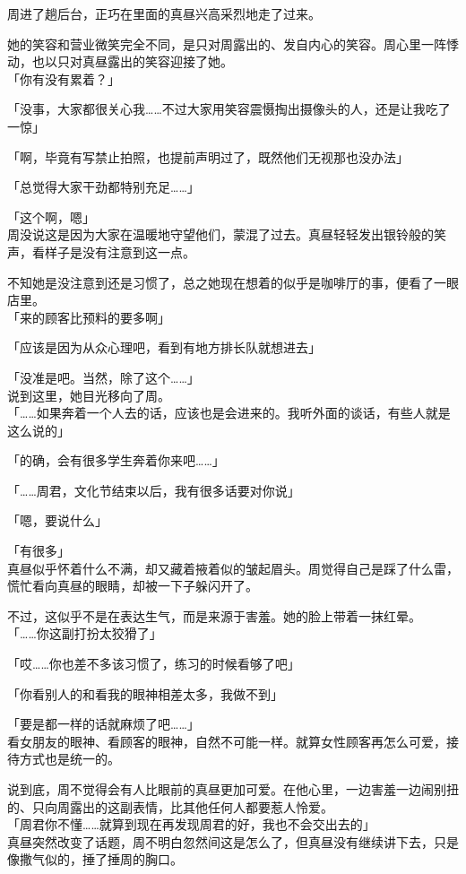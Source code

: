 周进了趟后台，正巧在里面的真昼兴高采烈地走了过来。

她的笑容和营业微笑完全不同，是只对周露出的、发自内心的笑容。周心里一阵悸动，也以只对真昼露出的笑容迎接了她。\\

「你有没有累着？」

「没事，大家都很关心我……不过大家用笑容震慑掏出摄像头的人，还是让我吃了一惊」

「啊，毕竟有写禁止拍照，也提前声明过了，既然他们无视那也没办法」

「总觉得大家干劲都特别充足……」

「这个啊，嗯」\\

周没说这是因为大家在温暖地守望他们，蒙混了过去。真昼轻轻发出银铃般的笑声，看样子是没有注意到这一点。

不知她是没注意到还是习惯了，总之她现在想着的似乎是咖啡厅的事，便看了一眼店里。\\

「来的顾客比预料的要多啊」

「应该是因为从众心理吧，看到有地方排长队就想进去」

「没准是吧。当然，除了这个……」\\

说到这里，她目光移向了周。\\

「……如果奔着一个人去的话，应该也是会进来的。我听外面的谈话，有些人就是这么说的」

「的确，会有很多学生奔着你来吧……」

「……周君，文化节结束以后，我有很多话要对你说」

「嗯，要说什么」

「有很多」\\

真昼似乎怀着什么不满，却又藏着掖着似的皱起眉头。周觉得自己是踩了什么雷，慌忙看向真昼的眼睛，却被一下子躲闪开了。

不过，这似乎不是在表达生气，而是来源于害羞。她的脸上带着一抹红晕。\\

「……你这副打扮太狡猾了」

「哎……你也差不多该习惯了，练习的时候看够了吧」

「你看别人的和看我的眼神相差太多，我做不到」

「要是都一样的话就麻烦了吧……」\\

看女朋友的眼神、看顾客的眼神，自然不可能一样。就算女性顾客再怎么可爱，接待方式也是统一的。

说到底，周不觉得会有人比眼前的真昼更加可爱。在他心里，一边害羞一边闹别扭的、只向周露出的这副表情，比其他任何人都要惹人怜爱。\\

「周君你不懂……就算到现在再发现周君的好，我也不会交出去的」\\

真昼突然改变了话题，周不明白忽然间这是怎么了，但真昼没有继续讲下去，只是像撒气似的，捶了捶周的胸口。
